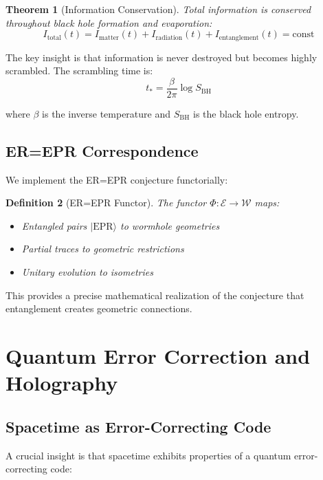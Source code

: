 \documentclass[12pt]{article}
\newtheorem{theorem}{Theorem}[section]
\newtheorem{definition}[theorem]{Definition}
\begin{document}
\begin{theorem}[Information Conservation]
Total information is conserved throughout black hole formation and evaporation:
\begin{equation}
I_{\text{total}}(t) = I_{\text{matter}}(t) + I_{\text{radiation}}(t) + I_{\text{entanglement}}(t) = \text{const}
\end{equation}
\end{theorem}

The key insight is that information is never destroyed but becomes highly scrambled. The scrambling time is:
\begin{equation}
t_* = \frac{\beta}{2\pi} \log S_{\text{BH}}
\end{equation}

where $\beta$ is the inverse temperature and $S_{\text{BH}}$ is the black hole entropy.

\subsection{ER=EPR Correspondence}

We implement the ER=EPR conjecture functorially:

\begin{definition}[ER=EPR Functor]
The functor $\Phi: \mathcal{E} \to \mathcal{W}$ maps:
\begin{itemize}
\item Entangled pairs $|\text{EPR}\rangle$ to wormhole geometries
\item Partial traces to geometric restrictions
\item Unitary evolution to isometries
\end{itemize}
\end{definition}

This provides a precise mathematical realization of the conjecture that entanglement creates geometric connections.

\section{Quantum Error Correction and Holography}

\subsection{Spacetime as Error-Correcting Code}

A crucial insight is that spacetime exhibits properties of a quantum error-correcting code:
\end{document}
